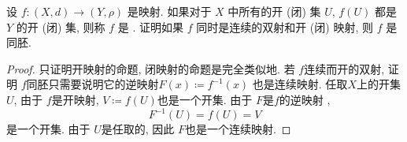\documentclass[../main.tex]{subfiles}
\begin{document}
\begin{exercise}{}{}
 设 $f:(X,d) \to (Y,\rho)$ 是映射. 如果对于 $X$ 中所有的开 (闭) 集 $U$, $f(U)$ 都是 $Y$ 的开 (闭) 集, 则称 $f$ 是 . 证明如果 $f$ 同时是连续的双射和开 (闭) 映射, 则 $f$ 是同胚.
\end{exercise}

\begin{proof}
  只证明开映射的命题, 闭映射的命题是完全类似地. 若 \(  f  \)连续而开的双射, 证明 \(  f  \)同胚只需要说明它的逆映射\(  F\left( x \right)\coloneqq f^{-1} \left( x \right)    \)     也是连续映射. 任取\(  X  \)上的开集 \(  U  \), 由于 \(  f  \)是开映射,  \(  V\coloneqq f\left( U \right)   \)也是一个开集. 由于 \(  F  \)是\(  f  \)的逆映射 ,  \[
  F^{-1} \left( U \right)= f\left( U \right) = V
  \]是一个开集. 由于 \(  U  \)是任取的, 因此 \(  F  \)也是一个连续映射. 
\end{proof}
\end{document}
